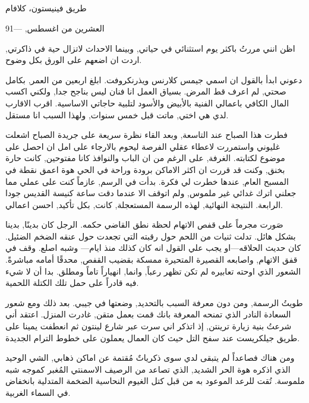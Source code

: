 \documentclass[12pt, a4paper]{article}
\newcommand{\head}[1]{
  \phantomsection
  \section*{\centering{\arabichead{#1}}}
  \addcontentsline{toc}{section}{#1}
}
\begin{document}
\begin{otherlanguage}{arabic}

\head{حرارة اغسطس}

{\bigbreak

طريق فينيستون، كلافام \bigbreak

العشرين من اغسطس, —91
}\bigbreak

اظن انني مررتُ باكثر يوم استثنائي في حياتي, وبينما الاحداث لاتزال حية في ذاكرتي, اردت ان اضعهم على الورق بكل وضوح. \medbreak

دعوني ابدأ بالقول ان اسمي جيمس كلارنس ويذرنكروفت. ابلغ اربعين من العمر, بكامل صحتي, لم اعرف قط المرض. 
بسياق العمل انا فنان ليس بناجح جدا, ولكني اكسب المال الكافي باعمالي الفنية بالأبيض والأسود لتلبية حاجاتي الاساسية.
اقرب الاقارب لدي هي اختي, ماتت قبل خمس سنوات, ولهذا السبب انا مستقل. \medbreak

فطرت هذا الصباح عند التاسعة, وبعد القاء نظرة سريعة على جريدة الصباح اشعلت غليوني واستمررت لاعطاء عقلي 
الفرصة ليحوم بالارجاء على امل ان احصل على موضوع لكتابته. الغرفة, على الرغم من ان الباب والنوافذ كانا مفتوحين, كانت 
حارة بخنق, وكنت قد قررت ان اكثر الاماكن برودة وراحة في الحي هوة اعمق نقطة في المسبح العام, عندها خطرت لي فكرة. بدأت في الرسم, عازماً كنت على عملي مما جعلني اترك غدائي غير ملموس, ولم اتوقف الا عندما دقت ساعة كنيسة القديس جودا الرابعة.
النتيجة النهائية, لهذه الرسمة المستعجلة, كانت, بكل تأكيد, احسن اعمالي. \medbreak

صَورت  مجرماً على قفص الاتهام لحظة نطق القاضي حكمه. الرجل كان
بدينًا, بدينا بشكل هائل. تدلت ثنيات من اللحم حول رقبته التي تجعدت حول عنقه الضخم الضئيل. كان حديث الحلاقه—او يجب علي القول
انه كان كذلك منذ ايام— وشبه اصلع. وقف في قفق الاتهام, واصابعه القصيرة المتحيرة ممسكة بقضيب القفص,  محدقًا أمامه مباشرةً. 
الشعور الذي اوحته تعابيره لم تكن تظهر رعباً, وانما, انهياراً تاماً ومطلق. بدا أن لا شيء فيه قادراً على حمل تلك الكتلة اللحمية. \medbreak

طويتُ الرسمة, ومن دون معرفة السبب بالتحديد, وضعتها في جيبي. بعد ذلك ومع شعور السعادة النادر الذي تمنحه المعرفة بانك قمت بعمل
متقن, غادرت المنزل. اعتقد أني شرعتُ بنية زيارة ترينتن, إذ اتذكر اني سرت عبر شارع لينتون ثم انعطفت يمينا على طريق جيلكريست عند
سفح التل حيث كان العمال يعملون على خطوط الترام الجديدة. \medbreak

ومن هناك فصاعداً لم يتبقى لدي سوى ذكرياتٌ مُقتمة عن اماكن ذهابي, الشي الوحيد الذي اذكره هوة الحر الشديد, الذي تصاعد
من الرصيف الاسمنتي المُغبر كموجه شبه ملموسة. تُقت للرعد الموعود به من قبل كتل الغيوم النحاسية الضخمة المتدلية بانخفاض 
في السماء الغربية. \medbreak




\end{otherlanguage}
\end{document}
